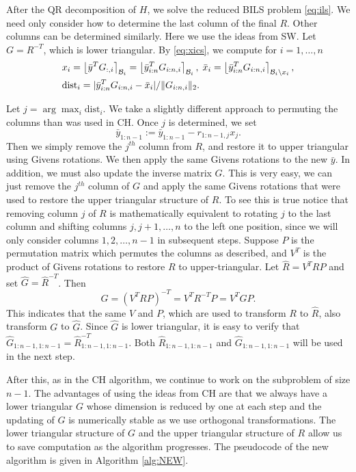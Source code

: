 \documentclass[12pt,Bold,letterpaper]{mcgilletdclass}
\newcommand{\dist}{\mathrm{dist}}
\begin{document}
After the QR decomposition of $H$, we  solve the reduced BILS problem \eqref{eq:ils}.
We need only consider how to determine the last column of the final $R$.
Other columns can be determined similarly. 
Here we use the ideas from SW.
Let $G=R^{-T}$, which is lower triangular.
By \eqref{eq:xics}, we compute for $i=1,\ldots, n$
\begin{align*}
& x_i = \left \lfloor \bar{y}^TG_{:,i} \right \rceil_{{\cal B}_i} 
=\left \lfloor \bar{y}_{i:n}^T G_{i:n,i} \right \rceil_{{\cal B}_i}, \;
\bar{x}_i=\left \lfloor \bar{y}_{i:n}^T G_{i:n,i} \right \rceil_{{\cal B}_i\backslash x_i}, \\
& \dist_i = |\bar{y}_{i:n}^T G_{i:n,i}-\bar{x}_i|/\|G_{i:n,i}\|_2.
\end{align*}

Let $j=\arg\max_{i} \dist_i$. We  take a slightly different approach to
permuting the columns than was used in CH. Once $j$ is determined, we  
set $$\bar{y}_{1:n-1} := \bar{y}_{1:n-1} - r_{1:n-1,j}x_j.$$ Then we simply remove
the $j^{th}$ column from $R$, and restore it to upper triangular using
Givens rotations. We then apply the same Givens rotations to the new
$\bar{y}$. In addition, we must also update the inverse matrix $G$. This is
very easy, we can just remove the $j^{th}$ column of $G$ and apply the same
Givens rotations that were used to restore the upper triangular structure of
$R$. To see this is true notice that removing column $j$ of $R$ is
mathematically equivalent to rotating $j$ to the last column and shifting
columns $j, j+1, \ldots, n$ to the left one position, since we will only consider columns
$1, 2, \ldots, n-1$ in subsequent steps. Suppose $P$ is the permutation matrix which
permutes the columns as described, and $V^T$ is the product of Givens
rotations to restore $R$ to upper-triangular. Let $\hat{R} = V^TRP$ and set
$\hat{G} = \hat{R}^{-T}$. Then
$$
\hat{G} = (V^TRP)^{-T} = V^TR^{-T}P = V^TGP.
$$
This indicates that  the same $V$ and $P$, which are used to transform $R$ to  $\hat{R}$, 
also transform $G$ to $\hat{G}$.
Since $\hat{G}$ is lower triangular, it is easy to verify that
$\hat{G}_{1:n-1,1:n-1} = \hat{R}^{-T}_{1:n-1,1:n-1}$.
Both $\hat{R}_{1:n-1,1:n-1}$ and $\hat{G}_{1:n-1,1:n-1}$ will be used in the next step.

After this, as in the CH algorithm, we continue to work on the subproblem of size $n-1$. 
The advantages of using the ideas from CH are that we always have a lower triangular $G$
whose dimension is reduced by one at each step
and the updating of $G$ is numerically stable as we use orthogonal transformations. The lower triangular structure of $G$ and the upper triangular structure of $R$ allow us to save computation as the algorithm progresses.
The pseudocode of the new algorithm is given in Algorithm  \ref{alg:NEW}.
\end{document}
